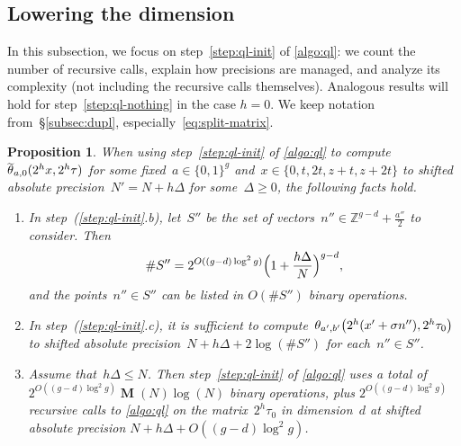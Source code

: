 \documentclass[12pt,oneside]{amsart}
\numberwithin{equation}{section}
\newtheorem{prop}[equation]{Proposition}
\theoremstyle{definition}
\newcommand{\Z}{\mathbb{Z}}
\DeclareMathOperator{\thetatilde}{\rlap{\raisebox{-0.1ex}{$\widetilde{\phantom{\,t}}$}}\theta}
\DeclareMathOperator{\Mul}{\mathbf{M}}
\DeclarePairedDelimiter{\paren}{(}{)}
\begin{document}
\subsection{Lowering the dimension}
\label{subsec:lowerdim}

In this subsection, we focus on step~\eqref{step:ql-init} of \cref{algo:ql}: we
count the number of recursive calls, explain how precisions are managed, and
analyze its complexity (not including the recursive calls
themselves). Analogous results will hold for step~\eqref{step:ql-nothing} in
the case $h=0$. We keep notation from~§\ref{subsec:dupl},
especially~\eqref{eq:split-matrix}.

\begin{prop}
  \label{prop:lowerdim-cost}
  When using step~\eqref{step:ql-init} of \cref{algo:ql} to compute
  $\thetatilde_{a,0}(2^hx,2^h\tau)$ for some fixed~$a\in\{0,1\}^g$
  and~$x\in \{0,t,2t,z+t,z+2t\}$ to shifted absolute
  precision~$N' = N + h\Delta$ for some~$\Delta\geq 0$, the following facts
  hold.
  \begin{enumerate}
  \item In step~(\ref{step:ql-init}.b), let~$S''$ be the set of
    vectors~$n''\in \Z^{g-d}+\tfrac{a''}{2}$ to consider. Then
    \begin{displaymath}
      \#S''= 2^{O((g-d)\log^2 g)} \paren[\Big]{1 + \frac{h\Delta}N}^{g-d},
    \end{displaymath}
    and the points~$n''\in S''$ can be listed in $O(\#S'')$ binary operations.
  \item \label{it:split-prec} In step~(\ref{step:ql-init}.c), it is sufficient to
    compute~$\theta_{a',b'}\paren[\big]{2^h(x'+\sigma n''),2^h\tau_0}$ to
    shifted absolute precision~$N + h\Delta + 2\log(\#S'')$ for each~$n''\in S''$.
  \item \label{it:split-cost} Assume that~$h\Delta \leq N$. Then
    step~\eqref{step:ql-init} of \cref{algo:ql} uses a total of
    $2^{O((g-d)\log^2 g)}\Mul(N)\log(N)$ binary operations, plus
    $2^{O((g-d)\log^2 g)}$ recursive calls to \cref{algo:ql} on the
    matrix~$2^h \tau_0$ in dimension~$d$ at shifted absolute precision
    $N + h\Delta + O((g-d)\log^2 g)$.
  \end{enumerate}
\end{prop}
\end{document}
